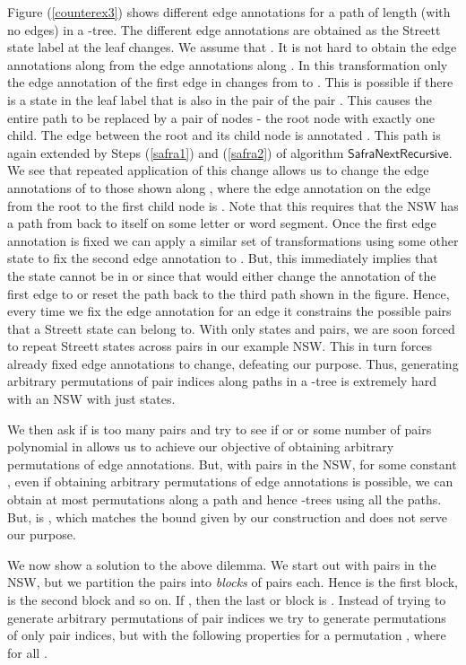 \documentclass[3p]{elsarticle}
\newcommand{\algo}[1]{\ensuremath{\textsf{{#1}}}}
\begin{document}
Figure (\ref{counterex3}) shows different edge annotations for a path of length
 (with no  edges) in a -tree. The different edge annotations are
obtained as the Streett state label at the leaf changes. We assume that .
It is not hard to obtain the edge annotations along  from the edge
annotations along . In this transformation only the edge annotation of
the first edge in  changes from  to . 
This is possible if there is a state  in the leaf label that is also in the
pair  of the pair . This causes the entire path to
be replaced by a pair of nodes - the root node with exactly one child.  The edge
between the root and its child node is annotated . This path is again
extended by Steps (\ref{safra1}) and (\ref{safra2}) of algorithm
\algo{SafraNextRecursive}. We see that repeated application of this change
allows us to change the edge annotations of  to those shown along
, where the edge annotation on the edge from the root to the first child
node is . Note that this requires that the NSW has a path from  back
to itself on some letter or word segment. Once the first edge annotation is
fixed we can apply a similar set of transformations using some other state 
to fix the second edge annotation to .  But, this immediately implies
that the state  cannot be in  or  since that would
either change the annotation of the first edge to  or reset the path
back to the third path  shown in the figure. Hence, every time we fix the edge
annotation for an edge it constrains the possible pairs that a Streett state can
belong to. With only  states and  pairs, we are soon forced to repeat
Streett states across pairs in our example NSW.  This in turn forces already
fixed edge annotations to change, defeating our purpose.  Thus, generating
arbitrary permutations of  pair indices along paths in a -tree is
extremely hard with an NSW with just  states. 

We then ask if  is too many pairs and try to see if  or  or some
number of pairs polynomial in  allows us to achieve our objective of
obtaining arbitrary permutations of edge annotations.  But, with  pairs in
the NSW, for some constant , even if obtaining arbitrary permutations of edge
annotations is possible, we can obtain at most  permutations along a
path and hence  -trees using all the paths. But,
 is , which matches the bound given by our
construction and does not serve our purpose. 

We now show a solution to the above dilemma. We start out with  pairs in
the NSW, but we partition the  pairs into 
\emph{blocks} of  pairs each.  Hence  is the
first block,  
is the second block and so on. If , then the
last or  block is 
 .  Instead of trying to generate arbitrary
permutations of  pair indices we try to generate permutations of only 
pair indices, but with the following properties for a permutation , where  for all .  
\end{document}
